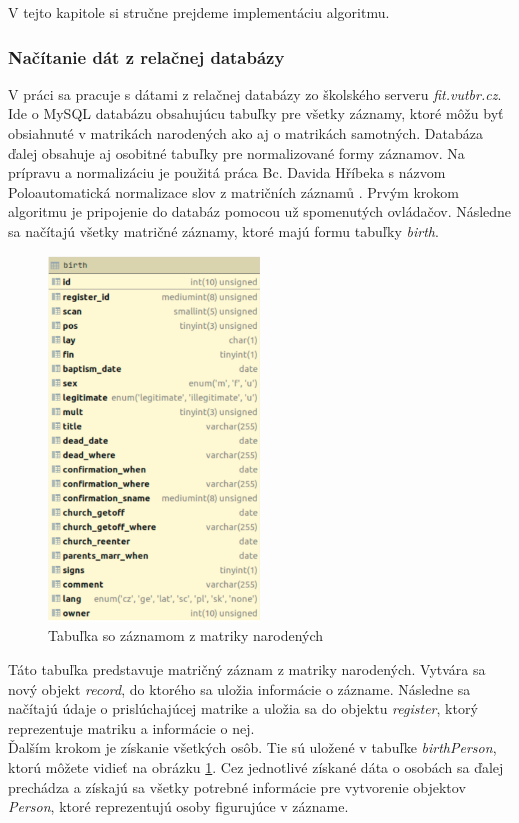 V tejto kapitole si stručne prejdeme implementáciu algoritmu.

\subsubsection{Načítanie dát z relačnej databázy}

V práci sa pracuje s dátami z relačnej databázy zo školského serveru \textit{fit.vutbr.cz}. Ide
o MySQL databázu obsahujúcu tabuľky pre všetky záznamy, ktoré môžu byť obsiahnuté
v matrikách narodených ako aj o matrikách samotných. Databáza ďalej obsahuje aj osobitné
tabuľky pre normalizované formy záznamov. Na prípravu a normalizáciu je použitá práca Bc.
Davida Hříbeka s názvom Poloautomatická normalizace slov z matričních záznamů \cite{normalizace}.
Prvým krokom algoritmu je pripojenie do databáz pomocou už spomenutých ovládačov.
Následne sa načítajú všetky matričné záznamy, ktoré majú formu tabuľky \textit{birth}.

\begin{figure}[h!]
  \label{birth}
  \begin{center}
  \includegraphics[width=0.5\textwidth]{obrazky-figures/birth_tabulka.png}
  \caption{Tabuľka so záznamom z matriky narodených}
  \end{center}
\end{figure}

Táto tabuľka predstavuje matričný záznam z matriky narodených. Vytvára sa nový objekt \textit{record}, do ktorého sa uložia informácie o zázname. Následne sa načítajú údaje
o prislúchajúcej matrike a uložia sa do objektu \textit{register}, ktorý reprezentuje matriku a
informácie o nej.\\
Ďalším krokom je získanie všetkých osôb. Tie sú uložené v tabuľke \textit{birthPerson}, ktorú môžete vidieť na obrázku \ref{birth}. Cez jednotlivé získané dáta o osobách sa ďalej
prechádza a získajú sa všetky potrebné informácie pre vytvorenie objektov \textit{Person}, ktoré
reprezentujú osoby figurujúce v zázname.

